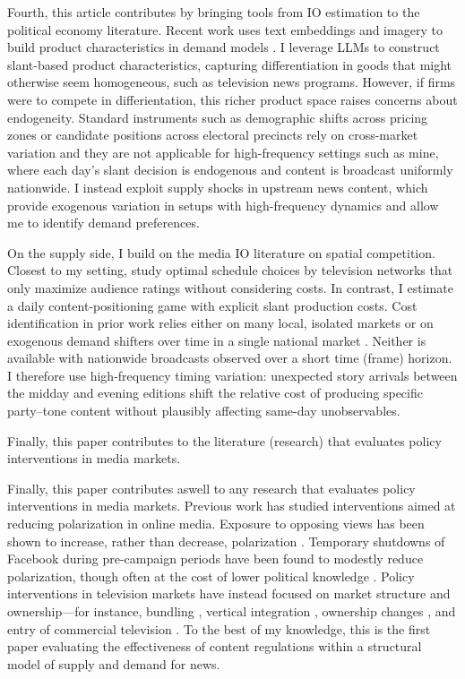 \documentclass[12pt]{article}
\begin{document}
	Fourth, this article contributes by bringing tools from IO estimation to the political economy literature. Recent work uses text embeddings and imagery to build product characteristics in demand models \citep{compiani2025demandestimationtextimage}. I leverage LLMs to construct slant-based product characteristics, capturing differentiation in goods that might otherwise seem homogeneous, such as television news programs. However, if firms were to compete in differientation, this richer product space raises concerns about endogeneity. Standard instruments such as demographic shifts across pricing zones \citep{fan} or candidate positions across electoral precincts \citep{longuet-marx2025party} rely on cross-market variation and they are not applicable for high-frequency settings such as mine,  where each day’s slant decision is endogenous and content is broadcast uniformly nationwide. I instead exploit supply shocks in upstream news content, which provide exogenous variation in setups with high-frequency dynamics and allow me to identify demand preferences. 
	
	
	
	On the supply side, I build on the media IO literature on spatial competition. Closest to my setting, \citet{Goettler2001SpatialCI} study optimal schedule choices by television networks that only maximize audience ratings without considering costs. In contrast, I estimate a daily content-positioning game with explicit slant production costs. Cost identification in prior work relies either on many local, isolated markets \citep[e.g.,][]{Draganska2008BeyondPV,fan} or on exogenous demand shifters over time in a single national market \citep{Wollmann2018TrucksWB}. Neither is available with nationwide broadcasts observed over a short time (frame) horizon. I therefore use high-frequency timing variation: unexpected story arrivals between the midday and evening editions shift the relative cost of producing specific party–tone content without plausibly affecting same-day unobservables. 
	
	
	Finally, this paper contributes to the literature (research) that evaluates policy interventions in media markets. 
	
	Finally, this paper contributes aswell to any research that evaluates policy interventions in media markets. 	Previous work has studied interventions aimed at reducing polarization in online media. Exposure to opposing views has been shown to increase, rather than decrease, polarization \citep{bail2018exposure}. Temporary shutdowns of Facebook during pre-campaign periods have been found to modestly reduce polarization, though often at the cost of lower political knowledge \citep{Allcott2024TheEO}. Policy interventions in television markets have instead focused on market structure and ownership—for instance, bundling \citep{crawford_yurukoglu}, vertical integration \citep{crawford_vertical}, ownership changes \citep{MARTIN_McCRAIN_2019}, and entry of commercial television \citep{prat_stromberg_entry}. To the best of my knowledge, this is the first paper evaluating the effectiveness of content regulations within a structural model of supply and demand for news.
	
\end{document}
